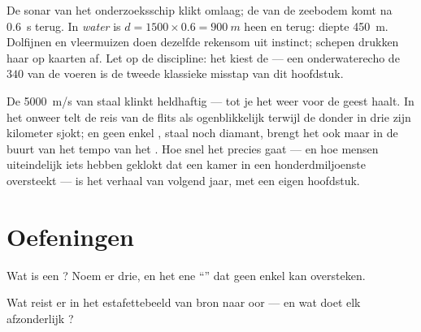 \begin{example}\label{ex:g7:sound-production:sonar}
De sonar van het onderzoeksschip klikt omlaag; de  van de
zeebodem komt na \qty{0.6}{s} terug. In \emph{water} is $d = 1500
\times 0.6 = \qty{900}{m}$ heen en terug: diepte \qty{450}{m}.
Dolfijnen en vleermuizen doen dezelfde rekensom uit instinct; schepen
drukken haar op kaarten af. Let op de discipline: het
 kiest de  --- een onderwaterecho de
$340$ van de  voeren is de tweede klassieke misstap van dit
hoofdstuk.
\end{example}

\begin{remark}\label{rem:g7:sound-production:light}
De \qty{5000}{m/s} van staal klinkt heldhaftig --- tot je het
 weer voor de geest haalt. In het onweer telt de reis van de
flits als ogenblikkelijk terwijl de donder in drie  zijn
kilometer sjokt; en geen enkel , staal noch diamant, brengt
het  ook maar in de buurt van het tempo van het
. Hoe snel het  precies gaat --- en hoe mensen
uiteindelijk iets hebben geklokt dat een kamer in een
honderdmiljoenste  oversteekt --- is het verhaal van volgend
jaar, met een eigen hoofdstuk.
\end{remark}

\section{Oefeningen}

\begin{exercise}[$\star$]\label{exo:g7:sound-production:1}
Wat is een ? Noem er drie, en het ene ``''
dat geen enkel  kan oversteken.
\end{exercise}

\begin{exercise}[$\star$]\label{exo:g7:sound-production:2}
Wat reist er in het estafettebeeld van bron naar oor --- en wat doet
elk afzonderlijk ?
\end{exercise}

